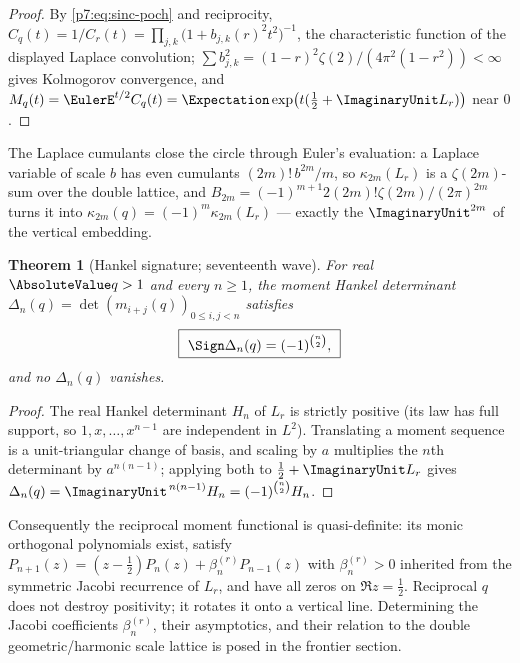 \documentclass[11pt,oneside]{article}
\numberwithin{equation}{section}
\newtheorem{theorem}{Theorem}[section]
\theoremstyle{definition}
\theoremstyle{remark}
\begin{document}
\begin{proof}
By \eqref{p7:eq:sinc-poch} and reciprocity,
$C_q(t)=1/C_r(t)=\prod_{j,k}\bigl(1+b_{j,k}(r)^2t^2\bigr)^{-1}$, the
characteristic function of the displayed Laplace convolution;
$\sum b_{j,k}^2=(1-r)^2\zeta(2)/(4\pi^2(1-r^2))<\infty$ gives Kolmogorov
convergence, and $M_q(t)=\EulerE^{t/2}C_q(t)=\Expectation\exp\bigl(t(\tfrac12+\ImaginaryUnit
L_r)\bigr)$ near $0$.
\end{proof}

The Laplace cumulants close the circle through Euler's evaluation: a Laplace
variable of scale $b$ has even cumulants $(2m)!\,b^{2m}/m$, so
$\kappa_{2m}(L_r)$ is a $\zeta(2m)$-sum over the double lattice, and
$B_{2m}=(-1)^{m+1}2(2m)!\zeta(2m)/(2\pi)^{2m}$ turns it into
$\kappa_{2m}(q)=(-1)^m\kappa_{2m}(L_r)$ --- exactly the $\ImaginaryUnit^{2m}$ of the
vertical embedding.

\begin{theorem}[Hankel signature; seventeenth wave]
\label{p7:thm:hankel}
For real $\AbsoluteValue q>1$ and every $n\ge1$, the moment Hankel determinant
$\Delta_n(q)=\det(m_{i+j}(q))_{0\le i,j<n}$ satisfies
\begin{equation}\label{p7:eq:hankel-signature}
 \boxed{\ \Sign\Delta_n(q)=(-1)^{\binom n2},\ }
\end{equation}
and no $\Delta_n(q)$ vanishes.
\end{theorem}

\begin{proof}
The real Hankel determinant $H_n$ of $L_r$ is strictly positive (its law has
full support, so $1,x,\ldots,x^{n-1}$ are independent in $L^2$).  Translating
a moment sequence is a unit-triangular change of basis, and scaling by $a$
multiplies the $n$th determinant by $a^{n(n-1)}$; applying both to
$\tfrac12+\ImaginaryUnit L_r$ gives $\Delta_n(q)=\ImaginaryUnit^{\,n(n-1)}H_n=(-1)^{\binom n2}H_n$.
\end{proof}

Consequently the reciprocal moment functional is quasi-definite: its monic
orthogonal polynomials exist, satisfy
$P_{n+1}(z)=(z-\tfrac12)P_n(z)+\beta_n^{(r)}P_{n-1}(z)$ with
$\beta_n^{(r)}>0$ inherited from the symmetric Jacobi recurrence of $L_r$, and
have all zeros on $\Re z=\tfrac12$.  Reciprocal $q$ does not destroy
positivity; it rotates it onto a vertical line.  Determining the Jacobi
coefficients $\beta_n^{(r)}$, their asymptotics, and their relation to the
double geometric/harmonic scale lattice is posed in the frontier section.
\end{document}
